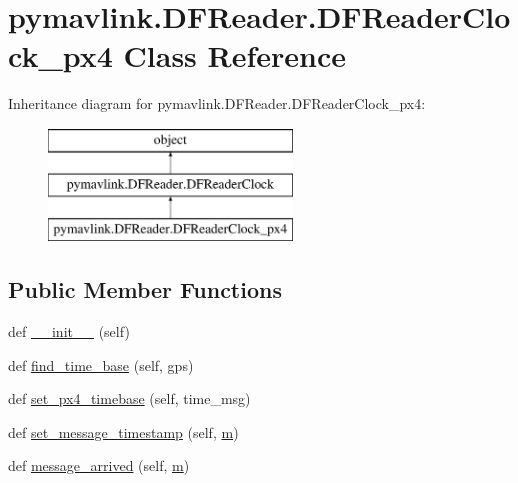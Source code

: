 \hypertarget{classpymavlink_1_1DFReader_1_1DFReaderClock__px4}{}\section{pymavlink.\+D\+F\+Reader.\+D\+F\+Reader\+Clock\+\_\+px4 Class Reference}
\label{classpymavlink_1_1DFReader_1_1DFReaderClock__px4}
Inheritance diagram for pymavlink.\+D\+F\+Reader.\+D\+F\+Reader\+Clock\+\_\+px4\+:\begin{figure}[H]
\begin{center}
\leavevmode
\includegraphics[height=3.000000cm]{classpymavlink_1_1DFReader_1_1DFReaderClock__px4}
\end{center}
\end{figure}
\subsection*{Public Member Functions}
\begin{DoxyCompactItemize}
\item 
def \mbox{\hyperlink{classpymavlink_1_1DFReader_1_1DFReaderClock__px4_a6fb11e110087f31f5c7cce4b8ee95a36}{\+\_\+\+\_\+init\+\_\+\+\_\+}} (self)
\item 
def \mbox{\hyperlink{classpymavlink_1_1DFReader_1_1DFReaderClock__px4_a7c7fbdf0097f50a76ebc096626a7be93}{find\+\_\+time\+\_\+base}} (self, gps)
\item 
def \mbox{\hyperlink{classpymavlink_1_1DFReader_1_1DFReaderClock__px4_aff4c8d2386feb420eb1e53498c2f5ed6}{set\+\_\+px4\+\_\+timebase}} (self, time\+\_\+msg)
\item 
def \mbox{\hyperlink{classpymavlink_1_1DFReader_1_1DFReaderClock__px4_aa489a357b826b628cf3df17231ad9e8e}{set\+\_\+message\+\_\+timestamp}} (self, \mbox{\hyperlink{namespacepymavlink_1_1DFReader_a41dcad484f9dfcaca656786d0882f168}{m}})
\item 
def \mbox{\hyperlink{classpymavlink_1_1DFReader_1_1DFReaderClock__px4_a8579ed60c84cf8ff01bce19e716a434f}{message\+\_\+arrived}} (self, \mbox{\hyperlink{namespacepymavlink_1_1DFReader_a41dcad484f9dfcaca656786d0882f168}{m}})
\end{DoxyCompactItemize}
